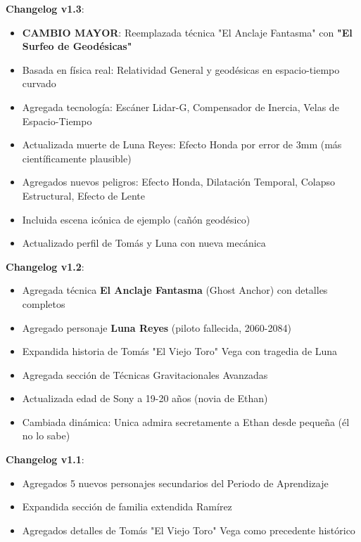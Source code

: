\documentclass[11pt,a4paper]{report}
\begin{document}
\textbf{Changelog v1.3}:
\begin{itemize}
  \item \textbf{CAMBIO MAYOR}: Reemplazada técnica "El Anclaje Fantasma" con \textbf{"El Surfeo de Geodésicas"}
  \item Basada en física real: Relatividad General y geodésicas en espacio-tiempo curvado
  \item Agregada tecnología: Escáner Lidar-G, Compensador de Inercia, Velas de Espacio-Tiempo
  \item Actualizada muerte de Luna Reyes: Efecto Honda por error de 3mm (más científicamente plausible)
  \item Agregados nuevos peligros: Efecto Honda, Dilatación Temporal, Colapso Estructural, Efecto de Lente
  \item Incluida escena icónica de ejemplo (cañón geodésico)
  \item Actualizado perfil de Tomás y Luna con nueva mecánica

\end{itemize}
\textbf{Changelog v1.2}:
\begin{itemize}
  \item Agregada técnica \textbf{El Anclaje Fantasma} (Ghost Anchor) con detalles completos
  \item Agregado personaje \textbf{Luna Reyes} (piloto fallecida, 2060-2084)
  \item Expandida historia de Tomás "El Viejo Toro" Vega con tragedia de Luna
  \item Agregada sección de Técnicas Gravitacionales Avanzadas
  \item Actualizada edad de Sony a 19-20 años (novia de Ethan)
  \item Cambiada dinámica: Unica admira secretamente a Ethan desde pequeña (él no lo sabe)

\end{itemize}
\textbf{Changelog v1.1}:
\begin{itemize}
  \item Agregados 5 nuevos personajes secundarios del Periodo de Aprendizaje
  \item Expandida sección de familia extendida Ramírez
  \item Agregados detalles de Tomás "El Viejo Toro" Vega como precedente histórico

\end{itemize}
\end{document}
